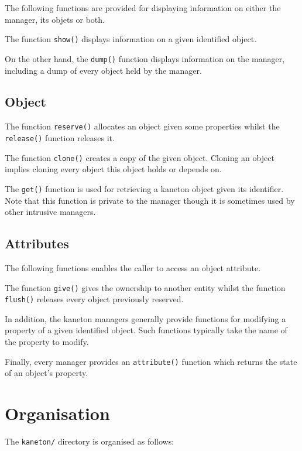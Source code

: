 The following functions are provided for displaying information on either
the manager, its objets or both.

The function \texttt{show()} displays information on a given identified object.

On the other hand, the \texttt{dump()} function displays information on the
manager, including a dump of every object held by the manager.


\subsection*{Object}

The function \texttt{reserve()} allocates an object given some properties
whilst the \texttt{release()} function releases it.

The function \texttt{clone()} creates a copy of the given object. Cloning an
object implies cloning every object this object holds or depends on.

The \texttt{get()} function is used for retrieving a kaneton object given its
identifier. Note that this function is private to the manager though it is
sometimes used by other intrusive managers.


\subsection*{Attributes}

The following functions enables the caller to access an object attribute.

The function \texttt{give()} gives the ownership to another entity whilst
the function \texttt{flush()} releases every object previously reserved.

In addition, the kaneton managers generally provide functions for modifying
a property of a given identified object. Such functions typically take the
name of the property to modify.

Finally, every manager provides an \texttt{attribute()} function which
returns the state of an object's property.

%
%

\section{Organisation}

The \texttt{kaneton/} directory is organised as follows:

